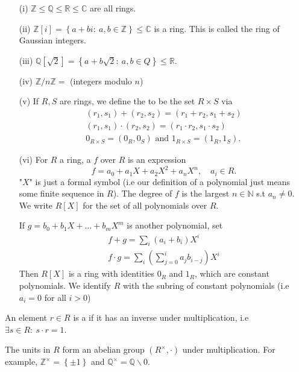 \documentclass[a4paper]{scrartcl}
\begin{document}
\begin{example*}
       \leavevmode
       \begin{itemize}
             \item[(i)] $\mathbb{Z} \leq \mathbb{Q} \leq \mathbb{R} \leq \mathbb{C}$ are all rings.
             \item[(ii)] $\mathbb{Z}[i]=\left\{a+bi: \ a,b \in \mathbb{Z}\right\} \leq \mathbb{C}$ is a ring. This is called the ring of Gaussian integers.
             \item[(iii)] $\mathbb{Q}[\sqrt{2}]=\left\{a+b \sqrt{2}: \ a,b \in Q\right\}\leq \mathbb{R}$.
             \item[(iv)] $\mathbb{Z}/n\mathbb{Z}=$ (integers modulo $n$)
             \item[(v)] If $R,S$ are rings, we define the  to be the set $R \times S$ via \begin{align*}
                  (r_1 ,s_1 )+ (r_2 ,s_2 )=(r_1 +r_2 ,s_1 +s_2 )\\
                  (r_1 ,s_1 )\cdot  (r_2 ,s_2 )=(r_1 \cdot r_2 ,s_1 \cdot s_2 )\\
                  0_{R \times S}=(0_{R},0_{S}) \text{ and } 1_{R \times S}=(1_R,1_S).
             \end{align*}  
             \item[(vi)] For $R$ a ring, a  $f$ over $R$ is an expression \[
             f=a_0 + a_1 X+a_2 X^2+ a_n X^{n}, \quad a_{i} \in R
             .\] "$X$" is just a formal symbol (i.e our definition of a polynomial just means some finite sequence in $R$). The degree of $f$ is the largest $n \in \mathbb{N}$ s.t $a_{n} \neq 0$. We write $R[X]$ for the set of all polynomials over $R$.

             If $g=b_0 +b_1 X + \ldots + b_{m}X^{m}$ is another polynomial, set 
             \begin{align*}
                   f+g= \sum_{i}^{}(a_{i}+b_{i})X^{i}\\
                   f \cdot g=\sum_{i}^{}(\sum_{j=0}^{i}a_{j}b_{i-j})X^{i}
             \end{align*}
             Then $R[X]$ is a ring with identities $0_{R}$ and $1_{R}$, which are constant polynomials. We identify $R$ with the subring of constant polynomials (i.e $a_{i}=0$ for all $i>0$)
       \end{itemize}
\end{example*}
\begin{definition*}[Unit]
       An element $r \in R$ is a  if it has an inverse under multiplication, i.e $\exists s \in R: \ s \cdot r=1$.

       The units in $R$ form an abelian group $(R^{\times},\cdot )$ under multiplication. For example, $\mathbb{Z}^{\times}=\left\{\pm 1\right\}$ and $\mathbb{Q}^{\times}=\mathbb{Q}\backslash 0$. 
\end{definition*}
\end{document}
